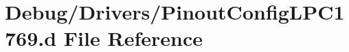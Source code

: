\hypertarget{_pinout_config_l_p_c1769_8d}{}\section{Debug/\+Drivers/\+Pinout\+Config\+L\+P\+C1769.d File Reference}
\label{_pinout_config_l_p_c1769_8d}
